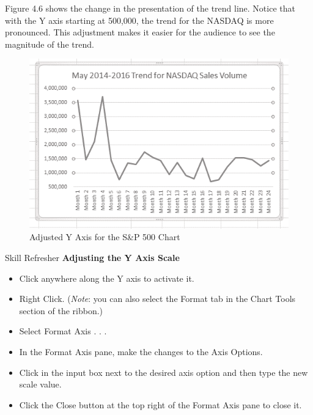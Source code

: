 Figure 4.6 shows the change in the presentation of the trend line. Notice that with the Y axis starting
at 500,000, the trend for the NASDAQ is more pronounced. This adjustment makes it easier for the
audience to see the magnitude of the trend.



\begin{figure}[H]
	\centering
	\includegraphics[width=\maxwidth{.95\linewidth}]{gfx/ch04_fig06}
	\caption{Adjusted Y Axis for the S\&P 500 Chart}
	\label{04:fig06}
\end{figure}




\begin{center}
	\begin{sklbox}{Skill Refresher}
		\textbf{Adjusting the Y Axis Scale}
		\\
		\begin{itemize}
			\setlength{\itemsep}{0pt}
			\setlength{\parskip}{0pt}
			\setlength{\parsep}{0pt}

			\item Click anywhere along the Y axis to activate it.
			\item Right Click. (\textit{Note}: you can also select the Format tab in the Chart Tools section of the ribbon.)
			\item Select Format Axis . . .
			\item In the Format Axis pane, make the changes to the Axis Options.
			\item Click in the input box next to the desired axis option and then type the new scale value.
			\item Click the Close button at the top right of the Format Axis pane to close it.
			
		\end{itemize}
	\end{sklbox}
\end{center}

